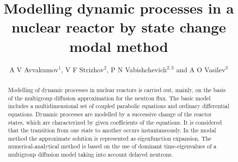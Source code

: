 \documentclass[a4paper]{jpconf}
\begin{document}
\title{Modelling dynamic processes in a nuclear reactor by state change modal method}

\author{A V Avvakumov$^1$, V F Strizhov$^2$, P N Vabishchevich$^{2,3}$ and A O Vasilev$^3$}

\address{$^1$ National Research Center Kurchatov Institute, Moscow, Russia}
\address{$^2$ Nuclear Safety Institute of RAS, Moscow, Russia}
\address{$^3$ North-Eastern Federal University, Yakutsk, Russia}


\begin{abstract}
Modelling of dynamic processes in nuclear reactors is carried out, mainly, on
the basis of the multigroup diffusion approximation for the neutron flux. 
The basic model includes a multidimensional set of coupled parabolic equations and
ordinary differential equations.
Dynamic processes are modelled by a successive
change of the reactor states, which are characterized by given coefficients of the equations. 
It is considered that the transition from one state to another occurs instantaneously.
In the modal method the approximate solution is represented as eigenfunction expansion. 
The numerical-analytical method is based on the use of dominant time-eigenvalues of
a multigroup diffusion model taking into account delayed neutrons. 
\end{abstract}
\end{document}
